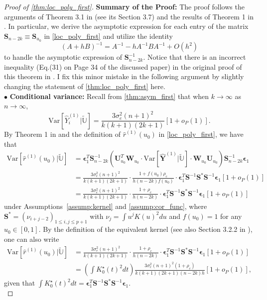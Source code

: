 \documentclass{uwstat572}
\theoremstyle{definition}
\renewcommand{\hat}{\widehat}
\renewcommand{\tilde}{\widetilde}
\theoremstyle{theorem}
\begin{document}
\begin{proof}[Proof of \autoref{thm:loc_poly_first}]
{\bf Summary of the Proof:} The proof follows the arguments of Theorem 3.1 in \cite{fan1996local} (see its Section 3.7) and the results of Theorem 1 in \cite{de2018local}. In particular, we derive the asymptotic expression for each entry of the matrix $\bm{S}_{n-2k}\equiv \bm{S}_{u_0}$ in \eqref{loc_poly_first} and utilize the identity
$$(A+hB)^{-1} = A^{-1} - hA^{-1} B A^{-1} + O(h^2)$$
to handle the asymptotic expression of $\bm{S}_{n-2k}^{-1}$. Notice that there is an incorrect inequality (Eq.(31) on Page 34 of the discussed paper) in the original proof of this theorem in \cite{liu2020smoothed}. I fix this minor mistake in the following argument by slightly changing the statement of \autoref{thm:loc_poly_first} here.\\

$\bullet$ {\bf Conditional variance:} Recall from \autoref{thm:asym_first} that when $k\to \infty$ as $n\to\infty$, 
$$\mathrm{Var}\left[\hat{Y}_i^{(1)} \big| \tilde{\mathbb{U}}\right] = \frac{3\sigma_e^2 (n+1)^2}{k(k+1)(2k+1)}\left[1+ o_P(1)\right].$$
By Theorem 1 in \cite{de2018local} and the definition of $\hat{r}^{(1)}(u_0)$ in \eqref{loc_poly_first}, we have that
\begin{align*}
\mathrm{Var}\left[\hat{r}^{(1)}(u_0) \big| \tilde{\mathbb{U}}\right] &= \bm{\epsilon}_1^T \bm{S}_{n-2k}^{-1} \left(\bm{U}_{u_0}^T \bm{W}_{u_0} \cdot \mathrm{Var}\left[\hat{\bm{Y}}^{(1)} \big| \tilde{\mathbb{U}}\right] \cdot \bm{W}_{u_0} \bm{U}_{u_0}\right) \bm{S}_{n-2k}^{-1} \bm{\epsilon}_1\\
&= \frac{3\sigma_e^2 (n+1)^2}{k(k+1)(2k+1)} \cdot \frac{1 + f(u_0)\rho_c}{h(n-2k) f(u_0)}\cdot \bm{\epsilon}_1^T \bm{S}^{-1} \bm{S}^* \bm{S}^{-1} \bm{\epsilon}_1\left[1+ o_P(1)\right]\\
&= \frac{3\sigma_e^2 (n+1)^2}{k(k+1)(2k+1)} \cdot \frac{1 + \rho_c}{h(n-2k)}\cdot \bm{\epsilon}_1^T \bm{S}^{-1} \bm{S}^* \bm{S}^{-1} \bm{\epsilon}_1\left[1+ o_P(1)\right]
\end{align*}
under Assumptions~\ref{assump:kernel} and \ref{assump:cor_func}, where  $\bm{S}^*=\left(\nu_{i+j-2}\right)_{1\leq i,j\leq p+1}$ with $\nu_j = \int u^j K(u)^2 du$ and $f(u_0)=1$ for any $u_0\in [0,1]$. By the definition of the equivalent kernel (see also Section 3.2.2 in \citealt{fan1996local}), one can also write
\begin{align*}
\mathrm{Var}\left[\hat{r}^{(1)}(u_0) \big| \tilde{\mathbb{U}}\right] &= \frac{3\sigma_e^2 (n+1)^2}{k(k+1)(2k+1)} \cdot \frac{1 + \rho_c}{h(n-2k)}\cdot \bm{\epsilon}_1^T \bm{S}^{-1} \bm{S}^* \bm{S}^{-1} \bm{\epsilon}_1\left[1+ o_P(1)\right] \\
&= \left(\int K_0^{\star}(t)^2 dt \right) \frac{3\sigma_e^2 (n+1)^2 (1+\rho_c)}{k(k+1)(2k+1) (n-2k) h} \left[1+o_P(1)\right],
\end{align*}
given that $\int K_0^{\star}(t)^2 dt = \bm{\epsilon}_1^T \bm{S}^{-1}\bm{S}^* \bm{S}^{-1} \bm{\epsilon}_1$.\\


\end{proof}
\end{document}
